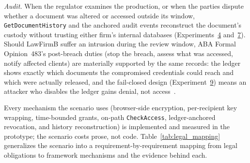 \documentclass[preprint,12pt]{elsarticle}
\begin{document}
\emph{Audit.} When the regulator examines the production, or when
the parties dispute whether a document was altered or accessed outside
its window, \texttt{GetDocumentHistory} and the anchored audit
events reconstruct the document's custody without trusting either
firm's internal databases (Experiments~\hyperref[sec:exp_audit]{4}
and~\hyperref[sec:exp_gethistory]{7}). Should LawFirmB suffer an
intrusion during the review window, ABA Formal Opinion~483's
post-breach duties (stop the breach, assess what was accessed,
notify affected clients) are materially supported by the same
records: the ledger shows exactly which documents the compromised
credentials could reach and which were actually released, and the
fail-closed design (Experiment~\hyperref[sec:exp_failclosed]{9})
means an attacker who disables the ledger gains denial, not
access~\cite{aba483}.

Every mechanism the scenario uses (browser-side encryption,
per-recipient key wrapping, time-bounded grants, on-path
\texttt{CheckAccess}, ledger-anchored revocation, and history
reconstruction) is implemented and measured in the prototype; the
scenario costs prose, not code. Table~\ref{tab:legal_mapping}
generalizes the scenario into a requirement-by-requirement mapping
from legal obligations to framework mechanisms and the evidence
behind each.
\end{document}

